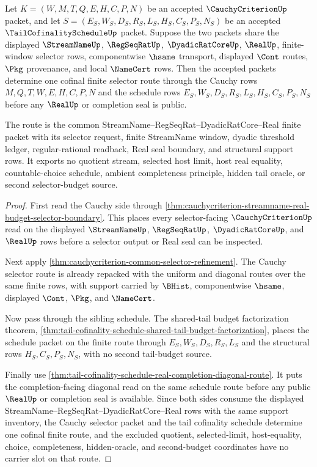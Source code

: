 \begin{theorem}
\label{thm:cauchycriterion-tailcofinalityschedule-selector-cofinality}
Let $K=(W,M,T,Q,E,H,C,P,N)$ be an accepted $\CauchyCriterionUp$ packet, and let
$S=(E_S,W_S,D_S,R_S,L_S,H_S,C_S,P_S,N_S)$ be an accepted
$\TailCofinalityScheduleUp$ packet. Suppose the two packets share the displayed
$\StreamNameUp$, $\RegSeqRatUp$, $\DyadicRatCoreUp$, $\RealUp$, finite-window
selector rows, componentwise $\hsame$ transport, displayed $\Cont$ routes,
$\Pkg$ provenance, and local $\NameCert$ rows. Then the accepted packets
determine one cofinal finite selector route through the Cauchy rows
$M,Q,T,W,E,H,C,P,N$ and the schedule rows $E_S,W_S,D_S,R_S,L_S,H_S,C_S,P_S,N_S$
before any $\RealUp$ or completion seal is public.

The route is the common StreamName--RegSeqRat--DyadicRatCore--Real finite packet
with its selector request, finite StreamName window, dyadic threshold ledger,
regular-rational readback, Real seal boundary, and structural support rows. It
exports no quotient stream, selected host limit, host real equality,
countable-choice schedule, ambient completeness principle, hidden tail oracle,
or second selector-budget source.
\end{theorem}
\begin{proof}
First read the Cauchy side through
\autoref{thm:cauchycriterion-streamname-real-budget-selector-boundary}. This
places every selector-facing $\CauchyCriterionUp$ read on the displayed
$\StreamNameUp$, $\RegSeqRatUp$, $\DyadicRatCoreUp$, and $\RealUp$ rows before a
selector output or Real seal can be inspected.

Next apply \autoref{thm:cauchycriterion-common-selector-refinement}. The Cauchy
selector route is already repacked with the uniform and diagonal routes over
the same finite rows, with support carried by $\BHist$, componentwise $\hsame$,
displayed $\Cont$, $\Pkg$, and $\NameCert$.

Now pass through the sibling schedule. The shared-tail budget factorization
theorem, \autoref{thm:tail-cofinality-schedule-shared-tail-budget-factorization},
places the schedule packet on the finite route through $E_S,W_S,D_S,R_S,L_S$
and the structural rows $H_S,C_S,P_S,N_S$, with no second tail-budget source.

Finally use
\autoref{thm:tail-cofinality-schedule-real-completion-diagonal-route}. It puts
the completion-facing diagonal read on the same schedule route before any public
$\RealUp$ or completion seal is available. Since both sides consume the
displayed StreamName--RegSeqRat--DyadicRatCore--Real rows with the same support
inventory, the Cauchy selector packet and the tail cofinality schedule determine
one cofinal finite route, and the excluded quotient, selected-limit,
host-equality, choice, completeness, hidden-oracle, and second-budget
coordinates have no carrier slot on that route.
\end{proof}

